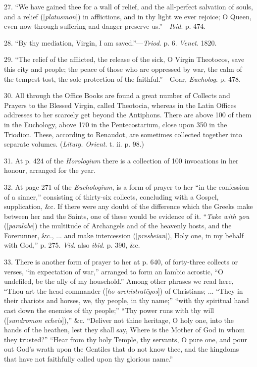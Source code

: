 27. ``We have gained thee for a wall of relief, and the
all-perfect salvation of souls, and a relief ([\emph{platusmon}]) in afflictions, and in thy light we ever rejoice; O Queen, even now
through suffering and danger preserve us.''—\emph{Ibid}. p. 474.


28. ``By thy mediation, Virgin, I am saved.''—\emph{Triod}.
p. 6. \emph{Venet}. 1820.


29. ``The relief of the afflicted, the release of the sick, O
Virgin Theotocos, save this city and people; the peace of those who are
oppressed by war, the calm of the tempest-tost, the sole protection of
the faithful.''—Goar, \emph{Eucholog}. p. 478.


30. All through the Office Books are found a great number of Collects
and Prayers to the Blessed Virgin, called Theotocia, whereas in the
Latin Offices addresses to her scarcely get beyond the Antiphons. There
are above 100 of them in the Euchology, above 170 in the Pentecostarium,
close upon 350 in the Triodion. These, according to Renaudot, are
sometimes collected together into separate volumes. (\emph{Liturg. Orient}.
t. ii. p. 98.)


31. At p. 424 of the \emph{Horologium} there is a collection of 100
invocations in her honour, arranged for the year.


32. At page 271 of the \emph{Euchologium}, is a form of prayer to her
``in the confession of a sinner,'' consisting of thirty-six
collects, concluding with a Gospel, supplication, \&c. If there were
any doubt of the difference which the Greeks make between her and the
Saints, one of these would be evidence of it. ``\emph{Take with you} ([\emph{paralabe}])
the multitude of Archangels and of the heavenly hosts, and the
Forerunner, \&c., ... and make intercession ([\emph{presbeian}]),
Holy one, in my behalf with God,'' p. 275. \emph{Vid}. also \emph{ibid}.
p. 390, \&c.


33. There is another form of prayer to her at p. 640, of
forty-three collects or verses, ``in expectation of war,''
arranged to form an Iambic acrostic, ``O undefiled, be the ally of
my household.'' Among other phrases we read here, ``Thou art the
head commander ([\emph{ho archistrat\={e}gos}]) of Christians; ...
``They in their chariots and horses, we, thy people, in thy
name;'' ``with thy spiritual hand cast down the enemies of thy
people;'' ``Thy power runs with thy will ([\emph{sundromon echeis}]),''
\&c. ``Deliver not thine heritage, O holy one, into the hands of
the heathen, lest they shall say, Where is the Mother of God in whom
they trusted?'' ``Hear from thy holy Temple, thy servants, O
pure one, and pour out God's wrath upon the Gentiles that do not know
thee, and the kingdoms that have not faithfully called upon thy glorious
name.''


